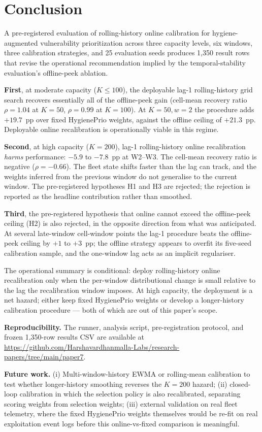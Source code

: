 \section{Conclusion}
\label{sec:conclusion}

A pre-registered evaluation of rolling-history online calibration for
hygiene-augmented vulnerability prioritization across three capacity
levels, six windows, three calibration strategies, and 25 evaluation
seeds produces 1{,}350 result rows that revise the operational
recommendation implied by the temporal-stability evaluation's offline-peek ablation.

\textbf{First}, at moderate capacity ($K \leq 100$), the deployable
lag-1 rolling-history grid search recovers essentially all of the
offline-peek gain (cell-mean recovery ratio $\rho = 1.04$ at
$K = 50$, $\rho = 0.99$ at $K = 100$). At $K = 50, w = 2$ the procedure
adds $+19.7$~pp over fixed HygienePrio weights, against the offline
ceiling of $+21.3$~pp. Deployable online recalibration is operationally
viable in this regime.

\textbf{Second}, at high capacity ($K = 200$), lag-1 rolling-history
online recalibration \textit{harms} performance: $-5.9$ to
$-7.8$~pp at W2--W3. The cell-mean recovery ratio is negative
($\rho = -0.66$). The fleet state shifts faster than the lag can
track, and the weights inferred from the previous window do not
generalise to the current window. The pre-registered hypotheses H1
and H3 are rejected; the rejection is reported as the headline
contribution rather than smoothed.

\textbf{Third}, the pre-registered hypothesis that online cannot
exceed the offline-peek ceiling (H2) is also rejected, in the
opposite direction from what was anticipated. At several late-window
cell-window points the lag-1 procedure beats the offline-peek
ceiling by $+1$ to $+3$~pp; the offline strategy appears to overfit
its five-seed calibration sample, and the one-window lag acts as
an implicit regulariser.

The operational summary is conditional: deploy rolling-history online
recalibration only when the per-window distributional change is small
relative to the lag the recalibration window imposes. At high
capacity, the deployment is a net hazard; either keep fixed HygienePrio
weights or develop a longer-history calibration procedure --- both
of which are out of this paper's scope.

\textbf{Reproducibility.} The runner, analysis script, pre-registration
protocol, and frozen 1{,}350-row results CSV are available at
\url{https://github.com/Harshavardhanmalla-Labs/research-papers/tree/main/paper7}.

\textbf{Future work.} (i) Multi-window-history EWMA or rolling-mean
calibration to test whether longer-history smoothing reverses the
$K = 200$ hazard; (ii) closed-loop calibration in which the selection
policy is also recalibrated, separating scoring weights from selection
weights; (iii) external validation on real fleet telemetry, where the
fixed HygienePrio weights themselves would be re-fit on real exploitation
event logs before this online-vs-fixed comparison is meaningful.
